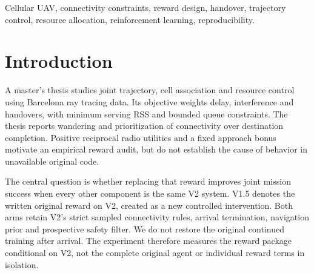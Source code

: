 \begin{abstract}
We compare a master's thesis reward with a replacement within a shared
cellular UAV control system, V2, using the same Barcelona ray tracing dataset
as the original thesis. The original reward arm, V1.5, shares V2's dynamics,
observations, navigation prior, safety filter, PPO settings and strict sampled
connectivity rules. Five training seeds and 400 fresh shared routes support
the initial comparison. Full V2 achieves \FullStd\% standard and \FullLong\% longer joint
success, versus \OriginalStd\% and \OriginalLong\% for V1.5. The primary
standard difference is \PrimaryDiff\ percentage points, with a 95\% crossed
seed and route bootstrap interval \PrimaryCI. \PrimaryAbstract{}
Full trades fewer handovers for higher delay. Every successful mission meets
the sampled RSS and buffer constraints. These results concern our declared
simulator; the original implementation remains unavailable.



\end{abstract}
\begin{IEEEkeywords}
Cellular UAV, connectivity constraints, reward design, handover, trajectory
control, resource allocation, reinforcement learning, reproducibility.
\end{IEEEkeywords}

\section{Introduction}
A master's thesis studies joint trajectory, cell association and resource
control using Barcelona ray tracing data\cite[pp.~6--7, Sec.~3.1]{thesis}.
Its objective weights delay, interference and handovers\cite[p.~10, Eq.~(11)]{thesis},
with minimum serving RSS and bounded queue constraints\cite[p.~11, Eq.~(12),
C2 and C4]{thesis}. The thesis reports wandering and prioritization of
connectivity over destination completion\cite[p.~19, Sec.~7.2; p.~21, Sec.~8]{thesis}.
Positive reciprocal radio utilities and a fixed approach bonus
\cite[p.~12, Eqs.~(13)--(14)]{thesis} motivate an empirical reward audit,
but do not establish the cause of behavior in unavailable original code.

The central question is whether replacing that reward improves joint mission
success when every other component is the same V2 system. V1.5 denotes the
written original reward on V2, created as a new controlled intervention.
Both arms retain V2's strict sampled connectivity rules, arrival termination,
navigation prior and prospective safety filter. We do not restore the original
continued training after arrival\cite[p.~12, Sec.~5.2]{thesis}. The experiment
therefore measures the reward package conditional on V2, not the complete
original agent or individual reward terms in isolation.


